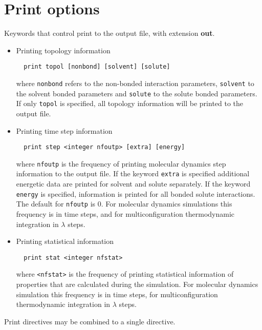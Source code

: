 \section{Print options}
Keywords that control print to the output file, with extension {\bf out}.
\begin{itemize}
\item
Printing topology information
\begin{verbatim}
  print topol [nonbond] [solvent] [solute]
\end{verbatim}
where {\tt nonbond} refers to the non-bonded interaction parameters,
{\tt solvent} to the solvent bonded parameters and {\tt solute} to the
solute bonded parameters. If only {\tt topol} is specified, all
topology information will be printed to the output file.
\item
Printing time step information
\begin{verbatim}
  print step <integer nfoutp> [extra] [energy]
\end{verbatim}
where \verb+nfoutp+ is the frequency of printing molecular dynamics step
information to the output file. If the keyword {\tt extra} is specified
additional energetic data are printed for solvent and solute separately.
If the keyword {\tt energy} is specified, information is printed for
all bonded solute interactions.
The default for \verb+nfoutp+ is 0. For molecular dynamics simulations
this frequency is in time steps, and for multiconfiguration thermodynamic
integration in $\lambda$ steps.
\item
Printing statistical information
\begin{verbatim}
  print stat <integer nfstat>
\end{verbatim}
where \verb+<nfstat>+ is the frequency of printing statistical information
of properties that are calculated during the simulation. 
For molecular dynamics simulation
this frequency is in time steps, for multiconfiguration thermodynamic
integration in $\lambda$ steps.
\end{itemize}
Print directives may be combined to a single directive.

